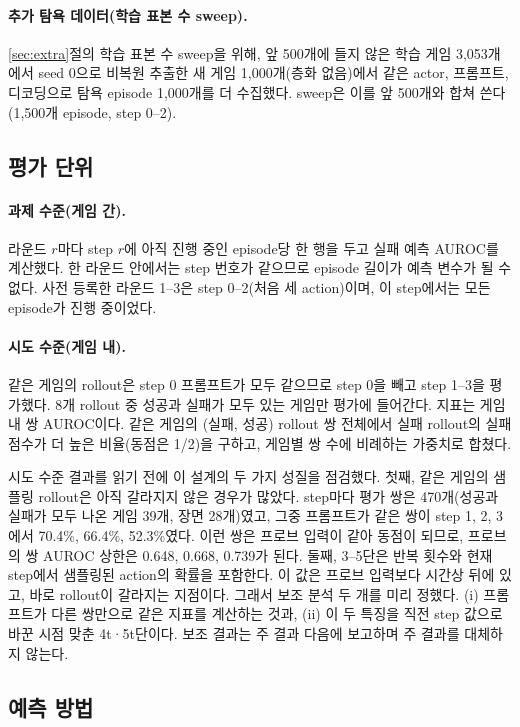 \documentclass[11pt]{article}
\begin{document}
\paragraph{추가 탐욕 데이터(학습 표본 수 sweep).} \ref{sec:extra}절의 학습 표본 수 sweep을 위해, 앞 500개에 들지 않은 학습 게임 3,053개에서 seed 0으로 비복원 추출한 새 게임 1,000개(층화 없음)에서 같은 actor, 프롬프트, 디코딩으로 탐욕 episode 1,000개를 더 수집했다. sweep은 이를 앞 500개와 합쳐 쓴다(1,500개 episode, step 0--2).

\subsection{평가 단위}
\paragraph{과제 수준(게임 간).} 라운드 $r$마다 step $r$에 아직 진행 중인 episode당 한 행을 두고 실패 예측 AUROC를 계산했다.
한 라운드 안에서는 step 번호가 같으므로 episode 길이가 예측 변수가 될 수 없다. 사전 등록한 라운드 1--3은 step 0--2(처음 세 action)이며,
이 step에서는 모든 episode가 진행 중이었다.

\paragraph{시도 수준(게임 내).} 같은 게임의 rollout은 step 0 프롬프트가 모두 같으므로 step 0을 빼고 step 1--3을 평가했다.
8개 rollout 중 성공과 실패가 모두 있는 게임만 평가에 들어간다. 지표는 게임 내 쌍 AUROC이다.
같은 게임의 (실패, 성공) rollout 쌍 전체에서 실패 rollout의 실패 점수가 더 높은 비율(동점은 1/2)을 구하고,
게임별 쌍 수에 비례하는 가중치로 합쳤다.

시도 수준 결과를 읽기 전에 이 설계의 두 가지 성질을 점검했다. 첫째, 같은 게임의 샘플링 rollout은 아직 갈라지지 않은 경우가 많았다.
step마다 평가 쌍은 470개(성공과 실패가 모두 나온 게임 39개, 장면 28개)였고, 그중 프롬프트가 같은 쌍이 step 1, 2, 3에서 70.4\%, 66.4\%, 52.3\%였다.
이런 쌍은 프로브 입력이 같아 동점이 되므로, 프로브의 쌍 AUROC 상한은 0.648, 0.668, 0.739가 된다.
둘째, 3--5단은 반복 횟수와 현재 step에서 샘플링된 action의 확률을 포함한다. 이 값은 프로브 입력보다 시간상 뒤에 있고, 바로 rollout이 갈라지는 지점이다.
그래서 보조 분석 두 개를 미리 정했다. (i) 프롬프트가 다른 쌍만으로 같은 지표를 계산하는 것과, (ii) 이 두 특징을 직전 step 값으로 바꾼 시점 맞춘 4t·5t단이다.
보조 결과는 주 결과 다음에 보고하며 주 결과를 대체하지 않는다.

\subsection{예측 방법}
\end{document}
